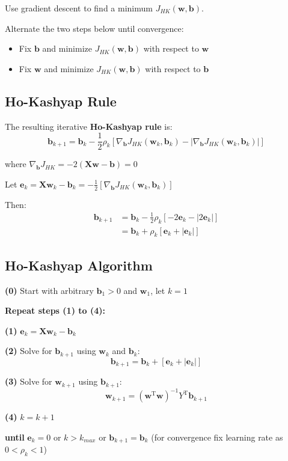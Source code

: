 \documentclass[11pt,a4paper]{article}
\theoremstyle{definition}
\theoremstyle{plain}
\theoremstyle{remark}
\begin{document}
Use gradient descent to find a minimum $J_{HK}(\mathbf{w}, \mathbf{b})$.

Alternate the two steps below until convergence:
\begin{itemize}
    \item Fix $\mathbf{b}$ and minimize $J_{HK}(\mathbf{w}, \mathbf{b})$ with respect to $\mathbf{w}$
    \item Fix $\mathbf{w}$ and minimize $J_{HK}(\mathbf{w}, \mathbf{b})$ with respect to $\mathbf{b}$
\end{itemize}

\subsection{Ho-Kashyap Rule}

\begin{tcolorbox}[colback=yellow!10!white,colframe=yellow!75!black,title=\textbf{Ho-Kashyap Rule}]
The resulting iterative \textbf{Ho-Kashyap rule} is:
\[
\mathbf{b}_{k+1} = \mathbf{b}_k - \frac{1}{2}\rho_k [\nabla_{\mathbf{b}} J_{HK}(\mathbf{w}_k, \mathbf{b}_k) - |\nabla_{\mathbf{b}} J_{HK}(\mathbf{w}_k, \mathbf{b}_k)|]
\]

where $\nabla_{\mathbf{b}} J_{HK} = -2 (\mathbf{X}\mathbf{w} - \mathbf{b}) = 0$

Let $\mathbf{e}_k = \mathbf{X}\mathbf{w}_k - \mathbf{b}_k = -\frac{1}{2}[\nabla_{\mathbf{b}} J_{HK}(\mathbf{w}_k, \mathbf{b}_k)]$

Then:
\begin{align*}
\mathbf{b}_{k+1} &= \mathbf{b}_k - \frac{1}{2}\rho_k [-2\mathbf{e}_k - |2\mathbf{e}_k|] \\
&= \mathbf{b}_k + \rho_k [\mathbf{e}_k + |\mathbf{e}_k|]
\end{align*}
\end{tcolorbox}

\subsection{Ho-Kashyap Algorithm}

\begin{tcolorbox}[colback=cyan!5!white,colframe=cyan!75!black,title=\textbf{Ho-Kashyap Algorithm}]
\textbf{(0)} Start with arbitrary $\mathbf{b}_1 > 0$ and $\mathbf{w}_1$, let $k=1$

\textbf{Repeat steps (1) to (4):}

\textbf{(1)} $\mathbf{e}_k = \mathbf{X}\mathbf{w}_k - \mathbf{b}_k$

\textbf{(2)} Solve for $\mathbf{b}_{k+1}$ using $\mathbf{w}_k$ and $\mathbf{b}_k$:
\[
\mathbf{b}_{k+1} = \mathbf{b}_k + [\mathbf{e}_k + |\mathbf{e}_k|]
\]

\textbf{(3)} Solve for $\mathbf{w}_{k+1}$ using $\mathbf{b}_{k+1}$:
\[
\mathbf{w}_{k+1} = (\mathbf{w}^{\mathrm{T}}\mathbf{w})^{-1} Y^{\mathrm{T}} \mathbf{b}_{k+1}
\]

\textbf{(4)} $k = k+1$

\textbf{until} $\mathbf{e}_k = 0$ or $k > k_{max}$ or $\mathbf{b}_{k+1} = \mathbf{b}_k$ (for convergence fix learning rate as $0 < \rho_k < 1$)
\end{tcolorbox}
\end{document}
